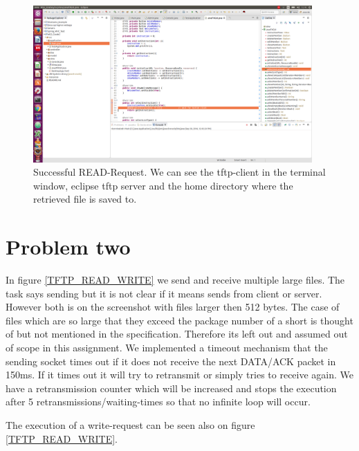 \documentclass[a4paper,12pt]{article}
\numberwithin{figure}{section}
\begin{document}
\begin{figure}[h!]
	\centering
	\includegraphics[width=0.95\textwidth,keepaspectratio]{img/problem1.png} 
	\caption{Successful READ-Request. We can see the tftp-client in the terminal window, eclipse tftp server and the home directory where the retrieved file is saved to.}
	\label{TFTP_READ}
\end{figure}

 

\newpage
\section{Problem two}

In figure \ref{TFTP_READ_WRITE} we send and receive multiple large files. The task says sending but it is not clear if it means sends from client or server. However both is on the screenshot with files larger then 512 bytes. The case of files which are so large that they exceed the package number of a short is thought of but not mentioned in the specification. Therefore its left out and assumed out of scope in this assignment. 
\newline \noindent
We implemented a timeout mechanism that the sending socket times out if it does not receive the next DATA/ACK packet in 150ms. If it times out it will try to retransmit or simply tries to receive again. We have a retransmission counter which will be increased and stops the execution after 5 retransmissions/waiting-times so that no infinite loop will occur. 

The execution of a write-request can be seen also on figure \ref{TFTP_READ_WRITE}. 
\end{document}
